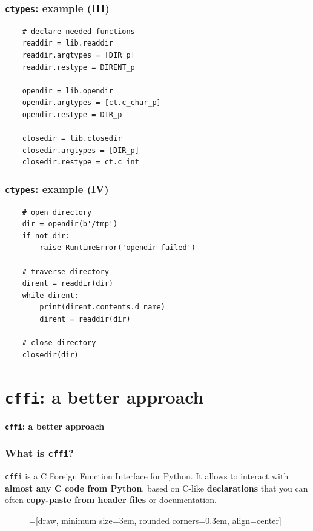 \documentclass{beamer}
\begin{document}
\begin{frame}[fragile]
  \frametitle{\texttt{ctypes}: example (III)}

  \begin{verbatim}
    # declare needed functions
    readdir = lib.readdir
    readdir.argtypes = [DIR_p]
    readdir.restype = DIRENT_p

    opendir = lib.opendir
    opendir.argtypes = [ct.c_char_p]
    opendir.restype = DIR_p

    closedir = lib.closedir
    closedir.argtypes = [DIR_p]
    closedir.restype = ct.c_int
  \end{verbatim}
\end{frame}

\begin{frame}[fragile]
  \frametitle{\texttt{ctypes}: example (IV)}

  \begin{verbatim}
    # open directory
    dir = opendir(b'/tmp')
    if not dir:
        raise RuntimeError('opendir failed')

    # traverse directory
    dirent = readdir(dir)
    while dirent:
        print(dirent.contents.d_name)
        dirent = readdir(dir)

    # close directory
    closedir(dir)
  \end{verbatim}
\end{frame}

\section{\texttt{cffi}: a better approach}

\begin{frame}[plain]{}
  \begin{center}
    \Huge \textbf{\texttt{cffi}: a better approach}
  \end{center}
\end{frame}

\begin{frame}
  \frametitle{What is \texttt{cffi}?}

  \texttt{cffi} is a C Foreign Function Interface for Python. It allows to
  interact with \textbf{almost any C code from Python}, based on C-like
  \textbf{declarations} that you can often \textbf{copy-paste from header files}
  or documentation.

  \begin{figure}
    \centering
    =[draw, minimum size=3em, rounded corners=0.3em, align=center]

  \end{figure}
\end{frame}
\end{document}
